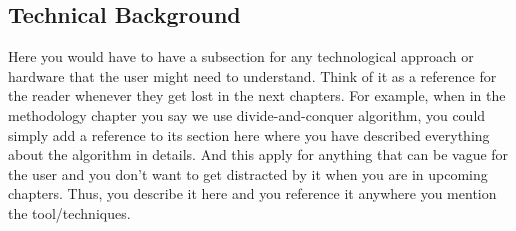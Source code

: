 \subsection{Technical Background}
\label{sub:technical_background2}

Here you would have to have a subsection for any technological approach or hardware that the user might need to understand. Think of it as a reference for the reader whenever they get lost in the next chapters. For example, when in the methodology chapter you say we use divide-and-conquer algorithm, you could simply add a reference to its section here where you have described everything about the algorithm in details. And this apply for anything that can be vague for the user and you don't want to get distracted by it when you are in upcoming chapters. Thus, you describe it here and you reference it anywhere you mention the tool/techniques.